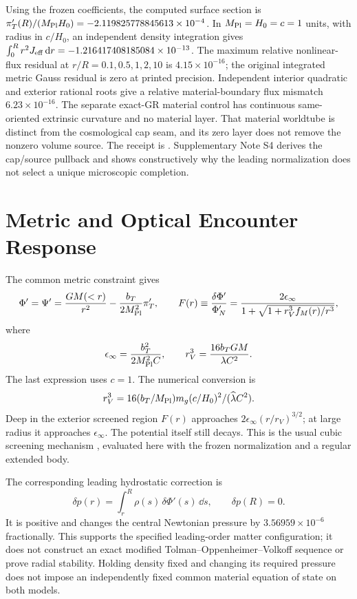 Using the frozen coefficients, the computed surface section is
$\pi_T'(R)/(M_{\rm Pl} H_0)=-2.119825778845613\times10^{-4}$.
In $M_{\rm Pl}=H_0=c=1$ units, with radius in $c/H_0$, an independent density
integration gives $\int_0^Rr^2J_{\rm eff}\,\mathrm d r
=-1.216417408185084\times10^{-13}$.
The maximum relative nonlinear-flux residual at
$r/R=0.1,0.5,1,2,10$ is $4.15\times10^{-16}$; the original integrated
metric Gauss residual is zero at printed precision. Independent interior
quadratic and exterior rational roots give a relative material-boundary
flux mismatch $6.23\times10^{-16}$. The separate exact-GR material
control has continuous same-oriented extrinsic curvature and no
material layer. That material worldtube is distinct from the cosmological
cap seam, and its zero layer does not remove the nonzero volume source.
The receipt is
.
Supplementary Note S4 derives the cap/source pullback and
shows constructively why the leading normalization does not select a
unique microscopic completion.

\section{Metric and Optical Encounter Response}
The common metric constraint gives
\begin{equation}
 \Phi'=\Psi'=\frac{GM(<r)}{r^2}
 -\frac{b_T}{2M_{\rm Pl}^2}\pi_T',\qquad
 F(r)\equiv\frac{\delta\Phi'}{\Phi_N'}
 =\frac{2\epsilon_\infty}
 {1+\sqrt{1+r_V^3 f_M(r)/r^3}},
 \label{eq:force}
\end{equation}
where
\begin{equation}
 \epsilon_\infty=\frac{b_T^2}{2M_{\rm Pl}^2C},
 \qquad r_V^3=\frac{16b_TGM}{\lambda C^2}.
 \label{eq:scales}
\end{equation}
The last expression uses $c=1$. The numerical conversion is
\[
r_V^3=16(b_T/M_{\rm Pl})m_g(c/H_0)^2/(\widehat\lambda C^2).
\]
Deep in the exterior screened region $F(r)$ approaches
$2\epsilon_\infty(r/r_V)^{3/2}$; at large radius it approaches
$\epsilon_\infty$. The potential itself still decays.
This is the usual cubic screening mechanism
\citep{Barreira2013,Barreira2015}, evaluated here with the frozen
normalization and a regular extended body.

The corresponding leading hydrostatic correction is
\begin{equation}
 \delta p(r)=\int_r^R \rho(s)\,\delta\Phi'(s)\,\dd s,\qquad
 \delta p(R)=0 .
 \label{eq:pressure}
\end{equation}
It is positive and changes the central Newtonian pressure by
$3.56959\times10^{-6}$ fractionally. This supports the specified
leading-order matter configuration; it does not construct an exact
modified Tolman--Oppenheimer--Volkoff sequence or prove radial stability.
Holding density fixed and changing its required pressure does not impose
an independently fixed common material equation of state on both models.

